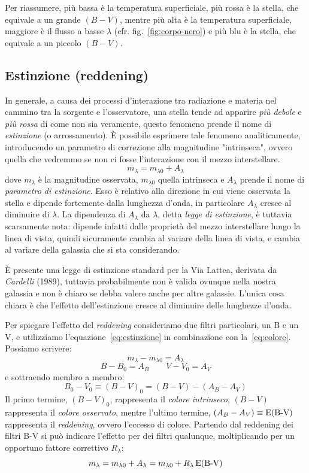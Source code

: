 Per riassumere, più bassa è la temperatura superficiale, più rossa è la stella, che equivale a un grande $(B-V)$, mentre più alta è la temperatura superficiale, maggiore è il flusso a basse $\lambda$ (cfr. fig.~\ref{fig:corpo-nero}) e più blu è la stella, che equivale a un piccolo $(B-V)$.

\subsection{Estinzione (reddening)}\label{sec:reddening}
In generale, a causa dei processi d'interazione tra radiazione e materia nel cammino tra la sorgente e l'osservatore, una stella tende ad apparire \emph{più debole} e \emph{più rossa} di come non sia veramente, questo fenomeno prende il nome di \emph{estinzione} (o arrossamento). È possibile esprimere tale fenomeno analiticamente, introducendo un parametro di correzione alla magnitudine "intrinseca", ovvero quella che vedremmo se non ci fosse l'interazione con il mezzo interstellare.
\begin{equation}\label{eq:estinzione}
    m_\lambda = m_{\lambda 0} + A_\lambda
\end{equation}
dove $m_\lambda$ è la magnitudine osservata, $m_{\lambda 0}$ quella intrinseca e $A_\lambda$ prende il nome di \emph{parametro di estinzione}. Esso è relativo alla direzione in cui viene osservata la stella e dipende fortemente dalla lunghezza d'onda, in particolare $A_\lambda$ cresce al diminuire di $\lambda$. La dipendenza di $A_\lambda$ da $\lambda$, detta \emph{legge di estinzione}, è tuttavia scarsamente nota: dipende infatti dalle proprietà del mezzo interstellare lungo la linea di vista, quindi sicuramente cambia al variare della linea di vista, e cambia al variare della galassia che si sta considerando.

È presente una legge di estinzione standard per la Via Lattea, derivata da \emph{Cardelli} (1989), tuttavia probabilmente non è valida ovunque nella nostra galassia e non è chiaro se debba valere anche per altre galassie. L'unica cosa chiara è che l'effetto dell'estinzione cresce al diminuire delle lunghezze d'onda.

Per spiegare l'effetto del \emph{reddening} consideriamo due filtri particolari, un B e un V, e utilizziamo l'equazione~\eqref{eq:estinzione} in combinazione con la~\eqref{eq:colore}. Possiamo scrivere:
\[
    m_\lambda - m_{\lambda 0} = A_\lambda
\]
\[
    B - B_0 = A_B \qquad V - V_0 = A_V
\]
e sottraendo membro a membro:
\[
    B_0 - V_0 \equiv (B-V)_0 = (B-V) - (A_B - A_V)
\]
Il primo termine, $(B-V)_0$, rappresenta il \emph{colore intrinseco}, $(B-V)$ rappresenta il \emph{colore osservato}, mentre l'ultimo termine, $(A_B-A_V) \equiv \operatorname{E(B-V)}$ rappresenta il \emph{reddening}, ovvero l'eccesso di colore. Partendo dal reddening dei filtri B-V si può indicare l'effetto per dei filtri qualunque, moltiplicando per un opportuno fattore correttivo $R_\lambda$:
\begin{equation}\label{eq:reddening}
    m_\lambda = m_{\lambda 0} + A_\lambda = m_{\lambda 0} + R_\lambda \operatorname{E(B-V)}
\end{equation}


